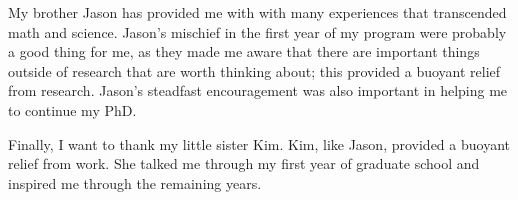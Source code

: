 My brother Jason has provided me with with many experiences that
transcended math and science.  Jason's mischief in the first year of
my program were probably a good thing for me, as they made me aware
that there are important things outside of research that are worth
thinking about; this provided a buoyant relief from research.  Jason's
steadfast encouragement was also important in helping me to continue
my PhD.

Finally, I want to thank my little sister Kim.  Kim, like Jason,
provided a buoyant relief from work.  She talked me through my first
year of graduate school and inspired me through the remaining years.
